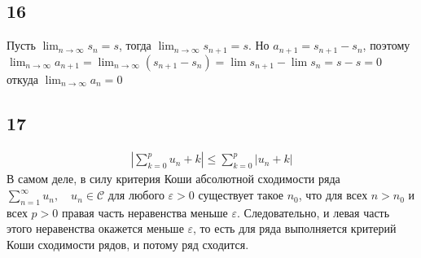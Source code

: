 		
		\subsection{16}
		Пусть $\lim_{n \to\infty} s_{n} = s$, тогда $\lim_{n \to\infty} s_{n+1} = s$. Но $a_{n+1} = s_{n+1} - s_{n}$, поэтому $\lim _{n \rightarrow \infty} a_{n+1}=\lim _{n \rightarrow \infty}\left(s_{n+1}-s_{n}\right)=\lim s_{n+1}-\lim s_{n}=s-s=0$ откуда $\lim_{n \to \infty} a_n = 0$
		
		\subsection{17}
		\begin{gather*}
			\left|\sum_{k=0}^{p} u_{n}+k\right| \leq \sum_{k=0}^{p}\left|u_{n}+k\right|
		\end{gather*}
		 В самом деле, в силу критерия Коши абсолютной сходимости ряда $\sum_{n=1}^{\infty} u_{n}, \quad u_{n} \in \mathcal{C}$ для любого $\varepsilon > 0$ существует такое $n_0$, что для всех $n > n_0$ и всех $p > 0$ правая часть неравенства меньше $\varepsilon$. Следовательно, и левая часть этого неравенства окажется меньше $\varepsilon$, то есть для ряда выполняется критерий Коши сходимости рядов, и потому ряд сходится.
		
